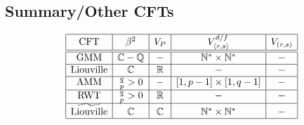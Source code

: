 \documentclass[12pt, a4paper]{article}
\theoremstyle{break}
\begin{document}
\subsection{Summary/Other CFTs}

\begin{align}
 \begin{array}{|c|c|c|c|c|}
  \hline 
  \text{CFT} & \beta^2 & V_P & V^{d/f}_{\langle r,s\rangle} & V_{(r,s)}
  \\
  \hline \hline 
  \text{GMM} & \mathbb{C}-\mathbb{Q} & - & \mathbb{N}^*\times \mathbb{N}^* &  - 
  \\
  \hline 
  \text{Liouville} & \mathbb{C} &  \mathbb{R} & - & -
  \\
  \hline
  \text{AMM} & \frac{q}{p} > 0 &  - &  [1,p-1]\times [1,q-1] & -
  \\
  \hline 
  \text{RWT} & \frac{q}{p} > 0 &  \mathbb{R} & - & -
  \\
  \hline 
  \widetilde{\text{Liouville}} & \mathbb{C} & \mathbb{C} & \mathbb{N}^*\times \mathbb{N}^* & -
  \\
  \hline 
 \end{array}
\end{align}
\end{document}
